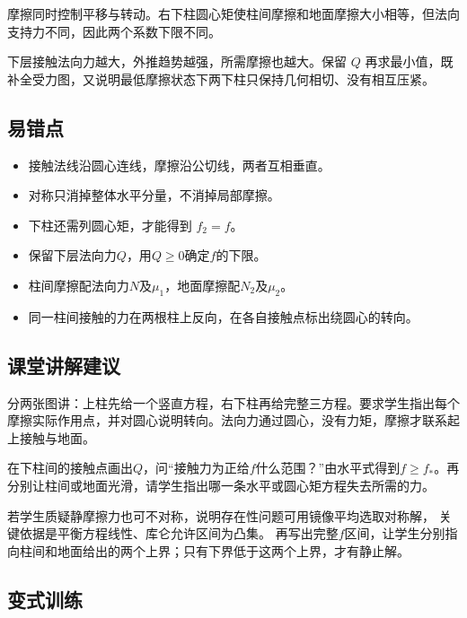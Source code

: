 \documentclass[UTF8,fontset=fandol,a4paper,11pt]{ctexart}
\begin{document}
摩擦同时控制平移与转动。右下柱圆心矩使柱间摩擦和地面摩擦大小相等，但法向支持力不同，因此两个系数下限不同。

下层接触法向力越大，外推趋势越强，所需摩擦也越大。保留 $Q$ 再求最小值，既补全受力图，又说明最低摩擦状态下两下柱只保持几何相切、没有相互压紧。



\subsection*{易错点}

\begin{itemize}\item 接触法线沿圆心连线，摩擦沿公切线，两者互相垂直。\item 对称只消掉整体水平分量，不消掉局部摩擦。\item 下柱还需列圆心矩，才能得到 $f_2=f$。\item 保留下层法向力$Q$，用$Q\ge0$确定$f$的下限。\item 柱间摩擦配法向力$N$及$\mu_1$，地面摩擦配$N_2$及$\mu_2$。\item 同一柱间接触的力在两根柱上反向，在各自接触点标出绕圆心的转向。\end{itemize}



\subsection*{课堂讲解建议}

分两张图讲：上柱先给一个竖直方程，右下柱再给完整三方程。要求学生指出每个摩擦实际作用点，并对圆心说明转向。法向力通过圆心，没有力矩，摩擦才联系起上接触与地面。

在下柱间的接触点画出$Q$，问“接触力为正给$f$什么范围？”由水平式得到$f\ge f_*$。再分别让柱间或地面光滑，请学生指出哪一条水平或圆心矩方程失去所需的力。

若学生质疑静摩擦力也可不对称，说明存在性问题可用镜像平均选取对称解，
关键依据是平衡方程线性、库仑允许区间为凸集。
再写出完整$f$区间，让学生分别指向柱间和地面给出的两个上界；只有下界低于这两个上界，才有静止解。



\subsection*{变式训练}
\end{document}
